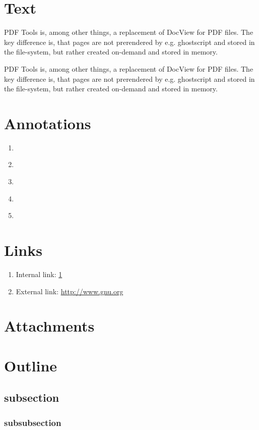 \documentclass{article}
\begin{document}
\section{Text}

\label{sec:text}
PDF Tools is, among other things, a replacement of DocView for PDF
files.  The key difference is, that pages are not prerendered by
e.g. ghostscript and stored in the file-system, but rather created
on-demand and stored in memory.

PDF Tools is, among other things, a replacement of DocView for PDF
files.  The key difference is, that pages are not prerendered by
e.g. ghostscript and stored in the file-system, but rather created
on-demand and stored in memory.
\newpage

\section{Annotations}

\label{sec:annotations}
\begin{enumerate}
\item {} \\
\item {} \\
\item {} \\
\item {} \\
\item {} \\
\end{enumerate}
\newpage

\section{Links}

\label{sec:links}

\begin{enumerate}
\item Internal link: \ref{sec:text}
\item External link: \url{http://www.gnu.org}
\end{enumerate}
\newpage

\section{Attachments}

\label{sec:attachments}

\newpage
\section{Outline}

\label{sec:outline}
\subsection{subsection}
\subsubsection{subsubsection}

\newpage
\indent
\end{document}

